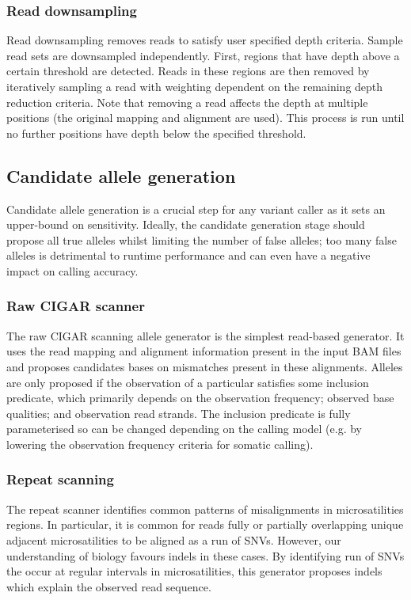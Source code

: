 \documentclass{article}
\begin{document}
\subsubsection{Read downsampling}

Read downsampling removes reads to satisfy user specified depth criteria. Sample read sets are downsampled independently. First, regions that have depth above a certain threshold are detected. Reads in these regions are then removed by iteratively sampling a read with weighting dependent on the remaining depth reduction criteria. Note that removing a read affects the depth at multiple positions (the original mapping and alignment are used). This process is run until no further positions have depth below the specified threshold.

\subsection{Candidate allele generation}\label{allele-generation}

Candidate allele generation is a crucial step for any variant caller as it sets an upper-bound on sensitivity. Ideally, the candidate generation stage should propose all true alleles whilst limiting the number of false alleles; too many false alleles is detrimental to runtime performance and can even have a negative impact on calling accuracy.

\subsubsection{Raw CIGAR scanner}

The raw CIGAR scanning allele generator is the simplest read-based generator. It uses the read mapping and alignment information present in the input BAM files and proposes candidates bases on mismatches present in these alignments. Alleles are only proposed if the observation of a particular satisfies some inclusion predicate, which primarily depends on the observation frequency; observed base qualities; and observation read strands. The inclusion predicate is fully parameterised so can be changed depending on the calling model (e.g. by lowering the observation frequency criteria for somatic calling).

\subsubsection{Repeat scanning}

The repeat scanner identifies common patterns of misalignments in microsatilities regions. In particular, it is common for reads fully or partially overlapping unique adjacent microsatilities to be aligned as a run of SNVs. However, our understanding of biology favours indels in these cases. By identifying run of SNVs the occur at regular intervals in microsatilities, this generator proposes indels which explain the observed read sequence. 
\end{document}
